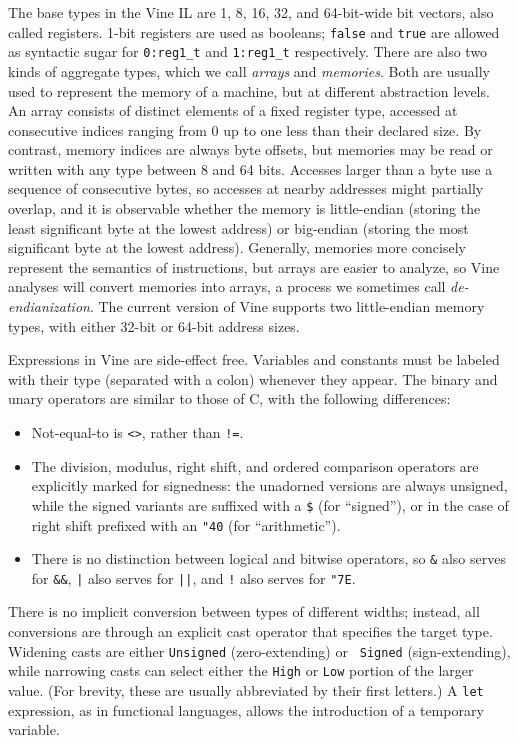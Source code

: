 The base types in the Vine IL are 1, 8, 16, 32, and 64-bit-wide bit
vectors, also called registers.
1-bit registers are used as booleans; {\tt false} and {\tt true} are
allowed as syntactic sugar for {\tt 0:reg1\_t} and {\tt 1:reg1\_t}
respectively.
There are also two kinds of aggregate types, which we call {\em arrays}
and {\em memories}.
Both are usually used to represent the memory of a machine, but at
different abstraction levels.
An array consists of distinct elements of a fixed register type,
accessed at consecutive indices ranging from 0 up to one less than
their declared size.
By contrast, memory indices are always byte offsets, but memories may
be read or written with any type between 8 and 64 bits.
Accesses larger than a byte use a sequence of consecutive bytes, so
accesses at nearby addresses might partially overlap, and it is
observable whether the memory is little-endian (storing the least
significant byte at the lowest address) or big-endian (storing
the most significant byte at the lowest address).
Generally, memories more concisely represent the semantics of
instructions, but arrays are easier to analyze, so Vine analyses will
convert memories into arrays, a process we sometimes call {\em
de-endianization}.
The current version of Vine supports two little-endian memory types,
with either 32-bit or 64-bit address sizes.

Expressions in Vine are side-effect free.
Variables and constants must be labeled with their type (separated
with a colon) whenever they appear.
The binary and unary operators are similar to those of C, with the
following differences:
\begin{itemize}
\item Not-equal-to is {\tt <>}, rather than {\tt !=}.
\item The division, modulus, right shift, and ordered comparison
  operators are explicitly marked for signedness: the unadorned
  versions are always unsigned, while the signed variants are suffixed
  with a {\tt \$} (for ``signed''), or in the case of right shift
  prefixed with an {\tt\char"40} (for ``arithmetic'').
\item There is no distinction between logical and bitwise
  operators, so {\tt \&} also serves for {\tt \&\&}, {\tt |} also
  serves for {\tt ||}, and {\tt !} also serves for {\tt \char"7E}.
\end{itemize}
There is no implicit conversion between types of different widths;
instead, all conversions are through an explicit cast operator that
specifies the target type.
Widening casts are either {\tt Unsigned} (zero-extending) or {\tt
Signed} (sign-extending), while narrowing casts can select either the
{\tt High} or {\tt Low} portion of the larger value.
(For brevity, these are usually abbreviated by their first letters.)
A {\tt let} expression, as in functional languages, allows the
introduction of a temporary variable.

